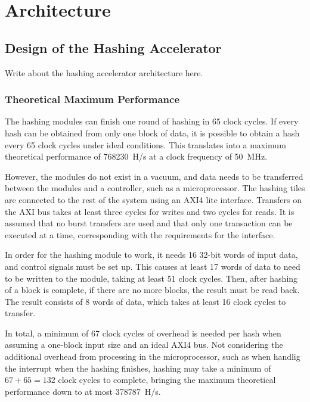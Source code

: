\chapter{Architecture}

\section{Design of the Hashing Accelerator}

Write about the hashing accelerator architecture here.

\subsection{Theoretical Maximum Performance}

The hashing modules can finish one round of hashing in 65 clock cycles. If
every hash can be obtained from only one block of data, it is possible to
obtain a hash every 65 clock cycles under ideal conditions. This translates
into a maximum theoretical performance of 768230~H/s at a clock frequency of
50~MHz.

However, the modules do not exist in a vacuum, and data needs to be transferred
between the modules and a controller, such as a microprocessor. The hashing tiles
are connected to the rest of the system using an AXI4 lite interface. Transfers
on the AXI bus takes at least three cycles for writes and two cycles for reads.
It is assumed that no burst transfers are used and that only one transaction
can be executed at a time, corresponding with the requirements for the interface.

In order for the hashing module to work, it needs 16 32-bit words of input data,
and control signals must be set up. This causes at least 17 words of data to
need to be written to the module, taking at least 51 clock cycles. Then, after
hashing of a block is complete, if there are no more blocks, the result must
be read back. The result consists of 8 words of data, which takes at least 16
clock cycles to transfer.

In total, a minimum of 67 clock cycles of overhead is needed per hash when assuming
a one-block input size and an ideal AXI4 bus. Not considering the additional overhead
from processing in the microprocessor, such as when handlig the interrupt when the
hashing finishes, hashing may take a minimum of $67 + 65 = 132$ clock cycles to
complete, bringing the maximum theoretical performance down to at most 378787~H/s.


